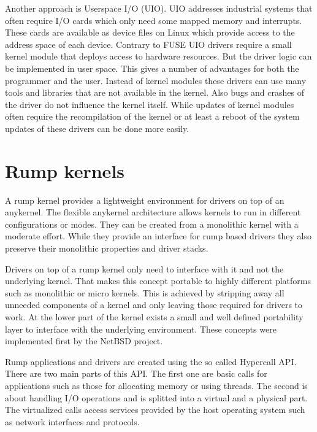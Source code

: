 \documentclass[
a4paper,
12pt,
notitlepage,
parskip=half,
DIV=11,
]{scrbook}
\begin{document}
		Another approach is Userspace I/O (UIO).
		UIO addresses industrial systems that often require I/O cards which only need some mapped memory and interrupts.
		These cards are available as device files on Linux which provide access to the address space of each device.
		Contrary to FUSE UIO drivers require a small kernel module that deploys access to hardware resources.
		But the driver logic can be implemented in user space.
		This gives a number of advantages for both the programmer and the user.
		Instead of kernel modules these drivers can use many tools and libraries that are not available in the kernel.
		Also bugs and crashes of the driver do not influence the kernel itself.
		While updates of kernel modules often require the recompilation of the kernel or at least a reboot of the system updates of these drivers can be done more easily. \citep{uio}
		
		\section{Rump kernels}
		A rump kernel provides a lightweight environment for drivers on top of an anykernel.
		The flexible anykernel architecture allows kernels to run in different configurations or modes.
		They can be created from a monolithic kernel with a moderate effort.
		While they provide an interface for rump based drivers they also preserve their monolithic properties and driver stacks. \citep{kantee}
		
		Drivers on top of a rump kernel only need to interface with it and not the underlying kernel.
		That makes this concept portable to highly different platforms such as monolithic or micro kernels.
		This is achieved by stripping away all unneeded components of a kernel and only leaving those required for drivers to work.
		At the lower part of the kernel exists a small and well defined portability layer to interface with the underlying environment.
		These concepts were implemented first by the NetBSD project. \citep{bsd_rump}\citep{fosdem_rump}\citep{rump}
		
		Rump applications and drivers are created using the so called Hypercall API.
		There are two main parts of this API.
		The first one are basic calls for applications such as those for allocating memory or using threads.
		The second is about handling I/O operations and is splitted into a virtual and a physical part.
		The virtualized calls access services provided by the host operating system such as network interfaces and protocols. \citep{rump_man} \citep{rump_platform}
		
\end{document}
